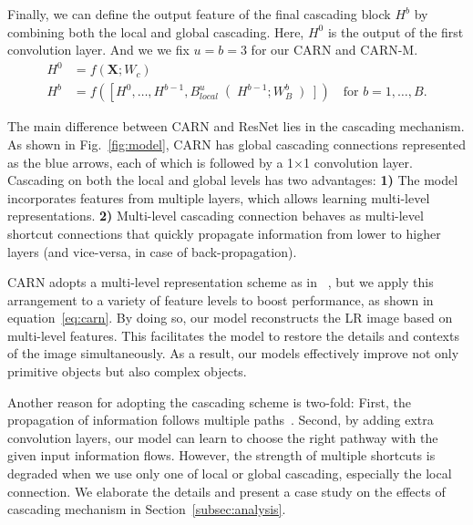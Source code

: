 \documentclass[runningheads]{llncs}
\begin{document}
Finally, we can define the output feature of the final cascading block $H^b$ by combining both the local and global cascading. Here, $H^0$ is the output of the first convolution layer. And we we fix $u=b=3$ for our CARN and CARN-M.
\begin{equation}\label{eq:carn}
\begin{split}
H^0 &= f\left(\boldsymbol{X};W_c\right) \\
H^b &= f\left(\left[H^0,\dots,H^{b-1},B^u_{local}\right(H^{b-1};W_B^b\left)\right]\right)\quad\text{for $b=1,\dots,B$.}
\end{split}
\end{equation}

The main difference between CARN and ResNet lies in the cascading mechanism. As shown in Fig.~\ref{fig:model}, CARN has global cascading connections represented as the blue arrows, each of which is followed by a 1$\times$1 convolution layer. Cascading on both the local and global levels has two advantages: \textbf{1)} The model incorporates features from multiple layers, which allows learning multi-level representations. \textbf{2)} Multi-level cascading connection behaves as multi-level shortcut connections that quickly propagate information from lower to higher layers (and vice-versa, in case of back-propagation).


CARN adopts a multi-level representation scheme as in ~\cite{lee2017multi,long2015fully}, but we apply this arrangement to a variety of feature levels to boost performance, as shown in equation~\ref{eq:carn}. By doing so, our model reconstructs the LR image based on multi-level features. This facilitates the model to restore the details and contexts of the image simultaneously. As a result, our models effectively improve not only primitive objects but also complex objects.

Another reason for adopting the cascading scheme is two-fold:
First, the propagation of information follows multiple paths~\cite{densenet,unet}.
Second, by adding extra convolution layers, our model can learn to choose the right pathway with the given input information flows. However, the strength of multiple shortcuts is degraded when we use only one of local or global cascading, especially the local connection. We elaborate the details and present a case study on the effects of cascading mechanism in Section~\ref{subsec:analysis}.
\end{document}
